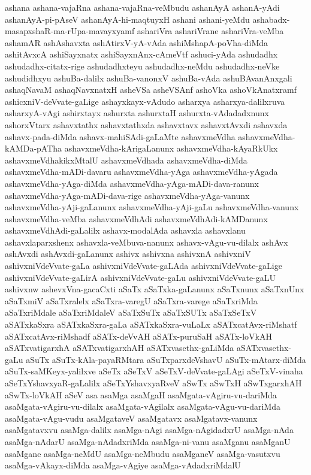 {ashana
ashana-vajaRna
ashana-vajaRna-veMbudu
ashanAyA
ashanA-yAdi
ashanAyA-pi-pAseV
ashanAyA-hi-maqtuyxH
ashani
ashani-yeMdu
ashabadx-masapxshaR-ma-rUpa-mavayxyamf
ashariVra
ashariVrane
ashariVra-veMba
ashamAR
ashAshavxta
ashAtirxV-yA-vAda
ashiMshapA-poVha-diMda
ashitAvxcA
ashiSayxnatx
ashiSayxnAnx-cAmeVtf
ashuci-yAda
ashudadhx
ashudadhx-citatx-rige
ashudadhxteyu
ashudadhx-neMdu
ashudadhx-neVke
ashudidhxyu
ashuBa-dalilx
ashuBa-vanonxV
ashuBa-vAda
ashuBAvanAnxgali
ashaqNavaM
ashaqNavxnatxH
asheVSa
asheVSAnf
ashoVka
ashoVkAnatxramf
ashicxniV-deVvate-gaLige
ashayxkayx-vAdudo
asharxya
asharxya-dalilxruva
asharxyA-vAgi
ashirxtayx
ashurxta
ashurxtaH
ashurxta-vAdadadxnunx
ashorxVtarx
ashavxtathx
ashavxtathxda
ashavxtavx
ashavxtAvxdi
ashavxda
ashavx-pada-diMda
ashavx-mahiSAdi-gaLaMte
ashavxmeVdha
ashavxmeVdha-kAMDa-pATha
ashavxmeVdha-kArigaLanunx
ashavxmeVdha-kAyaRkUkx
ashavxmeVdhakikxMtalU
ashavxmeVdhada
ashavxmeVdha-diMda
ashavxmeVdha-mADi-davaru
ashavxmeVdha-yAga
ashavxmeVdha-yAgada
ashavxmeVdha-yAga-diMda
ashavxmeVdha-yAga-mADi-dava-ranunx
ashavxmeVdha-yAga-mADi-dava-rige
ashavxmeVdha-yAga-vanunx
ashavxmeVdha-yAji-gaLanunx
ashavxmeVdha-yAji-gaLu
ashavxmeVdha-vanunx
ashavxmeVdha-veMba
ashavxmeVdhAdi
ashavxmeVdhAdi-kAMDanunx
ashavxmeVdhAdi-gaLalilx
ashavx-modalAda
ashavxla
ashavxlanu
ashavxlaparxshenx
ashavxla-veMbuva-nanunx
ashavx-vAgu-vu-dilalx
ashAvx
ashAvxdi
ashAvxdi-gaLanunx
ashivx
ashivxna
ashivxnA
ashivxniV
ashivxniVdeVvate-gaLa
ashivxniVdeVvate-gaLAda
ashivxniVdeVvate-gaLige
ashivxniVdeVvate-gaLirA
ashivxniVdeVvate-gaLu
ashivxniVdeVvate-gaLU
ashivxnw
ashevxVna-gacaCxti
aSaTx
aSaTxka-gaLanunx
aSaTxnunx
aSaTxnUnx
aSaTxmiV
aSaTxralelx
aSaTxra-varegU
aSaTxra-varege
aSaTxriMda
aSaTxriMdale
aSaTxriMdaleV
aSaTxSuTx
aSaTxSUTx
aSaTxSeTxV
aSATxkaSxra
aSATxkaSxra-gaLa
aSATxkaSxra-vuLaLx
aSATxcatAvx-riMshatf
aSATxcatAvx-riMshadf
aSATx-deVvAH
aSATx-puruSaH
aSATx-loVkAH
aSATxvatigarxhA
aSATxvatigarxhAH
aSATxvasethx-gaLiMda
aSATxvasethx-gaLu
aSuTx
aSuTx-kAla-payaRMtara
aSuTxparxdeVshavU
aSuTx-mAtarx-diMda
aSuTx-saMKeyx-yalilxve
aSeTx
aSeTxV
aSeTxV-deVvate-gaLAgi
aSeTxV-vinaha
aSeTxYshavxyaR-gaLalilx
aSeTxYshavxyaRveV
aSwTx
aSwTxH
aSwTxgarxhAH
aSwTx-loVkAH
aSeV
asa
asaMga
asaMgaH
asaMgata-vAgiru-vu-dariMda
asaMgata-vAgiru-vu-dilalx
asaMgata-vAgilalx
asaMgata-vAgu-vu-dariMda
asaMgata-vAgu-vudu
asaMgataveV
asaMgatavx
asaMgatavx-vanunx
asaMgatavxvu
asaMga-dalilx
asaMga-nAgi
asaMga-nAgidadxrU
asaMga-nAda
asaMga-nAdarU
asaMga-nAdadxriMda
asaMga-ni-vanu
asaMganu
asaMganU
asaMgane
asaMga-neMdU
asaMga-neMbudu
asaMganeV
asaMga-vasutxvu
asaMga-vAkayx-diMda
asaMga-vAgiye
asaMga-vAdadxriMdalU
}
